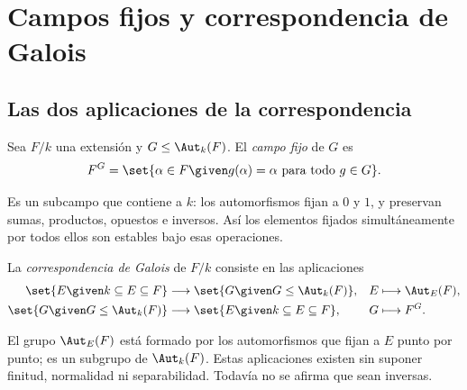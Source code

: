 \section{Campos fijos y correspondencia de Galois}
\subsection{Las dos aplicaciones de la correspondencia}
\begin{defi}
Sea $F/k$ una extensión y $G\leq\Aut_k(F)$. El \emph{campo fijo} de $G$ es
\[
F^G=\set{\alpha\in F\given g(\alpha)=\alpha\text{ para todo }g\in G}.
\]
\end{defi}
Es un subcampo que contiene a $k$: los automorfismos fijan a $0$ y $1$, y preservan sumas, productos, opuestos e inversos. Así los elementos fijados simultáneamente por todos ellos son estables bajo esas operaciones.

\begin{defi}
La \emph{correspondencia de Galois} de $F/k$ consiste en las aplicaciones
\[
\begin{aligned}
\set{E\given k\subseteq E\subseteq F}&\longrightarrow
\set{G\given G\leq\Aut_k(F)},& E&\longmapsto\Aut_E(F),\\
\set{G\given G\leq\Aut_k(F)}&\longrightarrow
\set{E\given k\subseteq E\subseteq F},& G&\longmapsto F^G.
\end{aligned}
\]
\end{defi}
El grupo $\Aut_E(F)$ está formado por los automorfismos que fijan a $E$ punto por punto; es un subgrupo de $\Aut_k(F)$. Estas aplicaciones existen sin suponer finitud, normalidad ni separabilidad. Todavía no se afirma que sean inversas.

